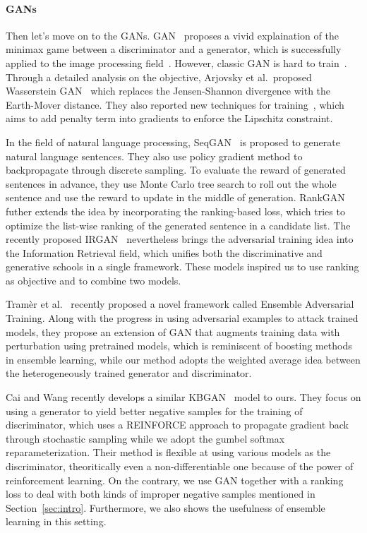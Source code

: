 \documentclass[twocolumn,a4paper,preprint,10pt,3p]{elsarticle}
\begin{document}
\paragraph{GANs} Then let's move on to the GANs. GAN~\cite{GAN} proposes a vivid explaination of the minimax game between a discriminator and a generator, which is successfully applied to the image processing field~\cite{Ledig_2017_CVPR}. However, classic GAN is hard to train~\cite{Salimans_2016}. Through a detailed analysis on the objective, Arjovsky et al.\ proposed Wasserstein GAN~\cite{Arjovsky2017WGAN} which replaces the Jensen-Shannon divergence with the Earth-Mover distance. They also reported new techniques for training~\cite{Gulrajani2017LipschitzReg}, which aims to add penalty term into gradients to enforce the Lipschitz constraint.

In the field of natural language processing, SeqGAN~\cite{SeqGAN} is proposed to generate natural language sentences. They also use policy gradient method to backpropagate through discrete sampling. To evaluate the reward of generated sentences in advance, they use Monte Carlo tree search to roll out the whole sentence and use the reward to update in the middle of generation. RankGAN~\cite{RankGAN} futher extends the idea by incorporating the ranking-based loss, which tries to optimize the list-wise ranking of the generated sentence in a candidate list. The recently proposed IRGAN~\cite{IRGAN} nevertheless brings the adversarial training idea into the Information Retrieval field, which unifies both the discriminative and generative schools in a single framework. These models inspired us to use ranking as objective and to combine two models.

Tram\`er et al.~\cite{EnsembleAdvTraining} recently proposed a novel framework called Ensemble Adversarial Training. Along with the progress in using adversarial examples to attack trained models, they propose an extension of GAN that augments training data with perturbation using pretrained models, which is reminiscent of boosting methods in ensemble learning, while our method adopts the weighted average idea between the heterogeneously trained generator and discriminator.

Cai and Wang recently develops a similar KBGAN~\cite{Cai2017KBGAN} model to ours. They focus on using a generator to yield better negative samples for the training of discriminator, which uses a REINFORCE approach to propagate gradient back through stochastic sampling while we adopt the gumbel softmax reparameterization. Their method is flexible at using various models as the discriminator, theoritically even a non-differentiable one because of the power of reinforcement learning. On the contrary, we use GAN together with a ranking loss to deal with both kinds of improper negative samples mentioned in Section~\ref{sec:intro}. Furthermore, we also shows the usefulness of ensemble learning in this setting.
\end{document}
